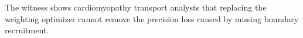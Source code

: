 The witness shows cardiomyopathy transport analysts that replacing the weighting optimizer cannot remove the precision loss caused by missing boundary recruitment.